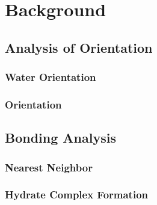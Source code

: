\section{Background}

\subsection{Analysis of Orientation}

\subsubsection{Water Orientation}
\subsubsection{\suldiox Orientation}

\subsection{Bonding Analysis}
\subsubsection{Nearest Neighbor}
\subsubsection{Hydrate Complex Formation}
